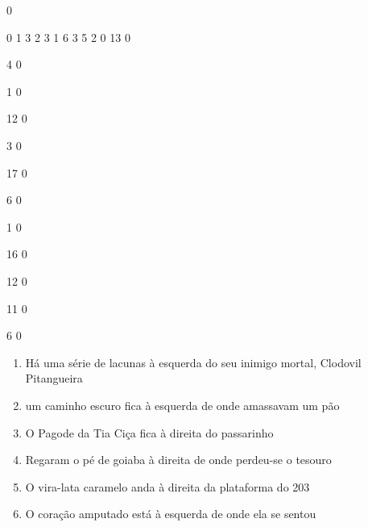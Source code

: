 \documentclass[12pt]{article}
\begin{document}
		\vfill  
		  
{
	0	%

	0	%
	1	%
	3	%
	2	%
	3	%
	1	%
	6	%
	3	%
	5	%
	2	%
	0	%
	13	%
	0	%

	4	%
	0	%

	1	%
	0	%

	12	%
	0	%

	3	%
	0	%

	17	%
	0	%

	6	%
	0	%

	1	%
	0	%

	16	%
	0	%

	12	%
	0	%

	11	%
	0	%

	6	%
	0	%

}	  
		    	

		 

\pagebreak


	\begin{enumerate}
		  \sffamily %
		  \large %


\vfill \item
Há uma série de lacunas	%
à esquerda
do seu inimigo mortal, Clodovil Pitangueira	%

\vfill \item
um caminho escuro fica	%
à esquerda
de onde amassavam um pão	%

\vfill \item
O Pagode da Tia Ciça fica	%
à direita
do passarinho	%

\vfill \item
Regaram o pé de goiaba	%
à direita
de onde perdeu-se o tesouro	%

\vfill \item
O vira-lata caramelo anda	%
à direita
da plataforma do 203	%

\vfill \item
O coração amputado está	%
à esquerda
de onde ela se sentou	%
	\end{enumerate}
		  
		  \hfill

		  \vfill
\end{document}

